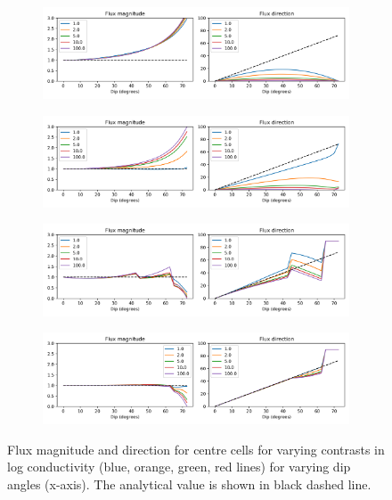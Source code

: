 \documentclass{article}
\begin{document}
\begin{figure}[p!]
\centering
\begin{subfigure}{0.9\textwidth}
	\includegraphics[width=\textwidth]{../figures/fig4_0_paper.png}
\end{subfigure}
\begin{subfigure}{0.9\textwidth}
	\includegraphics[width=\textwidth]{../figures/fig4_1_paper.png}
\end{subfigure}
\begin{subfigure}{0.9\textwidth}
	\includegraphics[width=\textwidth]{../figures/fig4_2_paper.png}
\end{subfigure}
\begin{subfigure}{0.9\textwidth}
	\includegraphics[width=\textwidth]{../figures/fig4_3_paper.png}
\end{subfigure}

\caption{Flux magnitude and direction for centre cells for varying contrasts in log conductivity (blue, orange, green, red lines) for varying dip angles (x-axis). The analytical value is shown in black dashed line.}
\label{fig:figures}
\end{figure}
\end{document}
